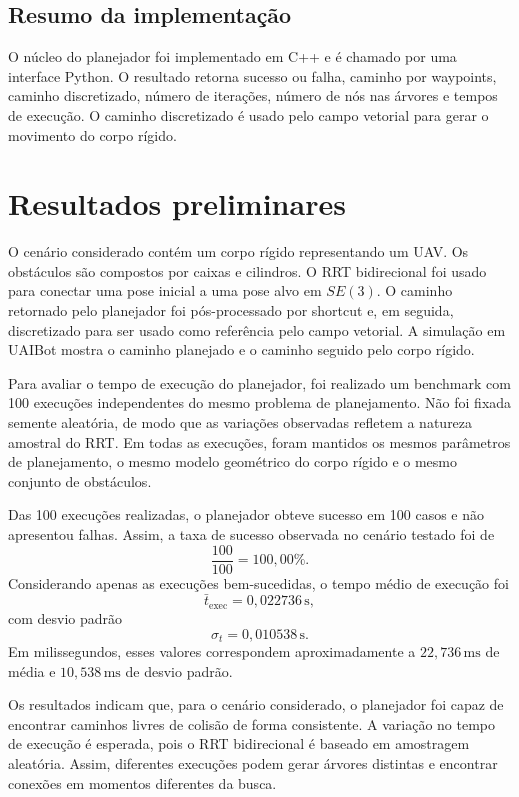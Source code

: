 \documentclass[12pt,a4paper]{article}
\begin{document}
\subsection{Resumo da implementação}

O núcleo do planejador foi implementado em C++ e é chamado por uma interface
Python. O resultado retorna sucesso ou falha, caminho por waypoints, caminho
discretizado, número de iterações, número de nós nas árvores e tempos de
execução. O caminho discretizado é usado pelo campo vetorial para gerar o
movimento do corpo rígido.

\section{Resultados preliminares}

O cenário considerado contém um corpo rígido representando um UAV. Os obstáculos
são compostos por caixas e cilindros. O RRT bidirecional foi usado para conectar
uma pose inicial a uma pose alvo em \(SE(3)\). O caminho retornado pelo
planejador foi pós-processado por shortcut e, em seguida, discretizado para ser
usado como referência pelo campo vetorial. A simulação em UAIBot mostra o
caminho planejado e o caminho seguido pelo corpo rígido.

Para avaliar o tempo de execução do planejador, foi realizado um benchmark com
100 execuções independentes do mesmo problema de planejamento. Não foi fixada
semente aleatória, de modo que as variações observadas refletem a natureza
amostral do RRT. Em todas as execuções, foram mantidos os mesmos parâmetros de
planejamento, o mesmo modelo geométrico do corpo rígido e o mesmo conjunto de
obstáculos.

Das 100 execuções realizadas, o planejador obteve sucesso em 100 casos e não
apresentou falhas. Assim, a taxa de sucesso observada no cenário testado foi de
\[
\frac{100}{100} = 100{,}00\%.
\]
Considerando apenas as execuções bem-sucedidas, o tempo médio de execução foi
\[
\bar{t}_{\mathrm{exec}} = 0{,}022736\,\mathrm{s},
\]
com desvio padrão
\[
\sigma_{t} = 0{,}010538\,\mathrm{s}.
\]
Em milissegundos, esses valores correspondem aproximadamente a
\(22{,}736\,\mathrm{ms}\) de média e \(10{,}538\,\mathrm{ms}\) de desvio padrão.

Os resultados indicam que, para o cenário considerado, o planejador foi capaz de
encontrar caminhos livres de colisão de forma consistente. A variação no tempo
de execução é esperada, pois o RRT bidirecional é baseado em amostragem
aleatória. Assim, diferentes execuções podem gerar árvores distintas e encontrar
conexões em momentos diferentes da busca.
\end{document}
